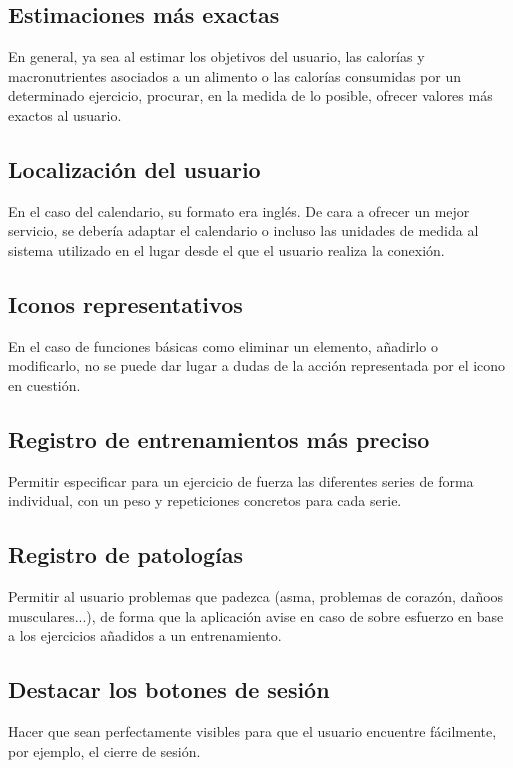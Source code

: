\documentclass[a4paper]{article}
\begin{document}
	\subsection{Estimaciones más exactas}
	
	En general, ya sea al estimar los objetivos del usuario, las calorías y macronutrientes asociados a un alimento o las calorías consumidas por un determinado ejercicio, procurar, en la medida de lo posible, ofrecer valores más exactos al usuario.
	
	\subsection{Localización del usuario}
	
	En el caso del calendario, su formato era inglés. De cara a ofrecer un mejor servicio, se debería adaptar el calendario o incluso las unidades de medida al sistema utilizado en el lugar desde el que el usuario realiza la conexión.
	
	\subsection{Iconos representativos}
	
	En el caso de funciones básicas como eliminar un elemento, añadirlo o modificarlo, no se puede dar lugar a dudas de la acción representada por el icono en cuestión.
	
	\subsection{Registro de entrenamientos más preciso}
	
	Permitir especificar para un ejercicio de fuerza las diferentes series de forma individual, con un peso y repeticiones concretos para cada serie.
	
	\subsection{Registro de patologías}
	
	Permitir al usuario problemas que padezca (asma, problemas de corazón, dañoos musculares...), de forma que la aplicación avise en caso de sobre esfuerzo en base a los ejercicios añadidos a un entrenamiento.
	
	\subsection{Destacar los botones de sesión}
	
	Hacer que sean perfectamente visibles para que el usuario encuentre fácilmente, por ejemplo, el cierre de sesión.
\end{document}
